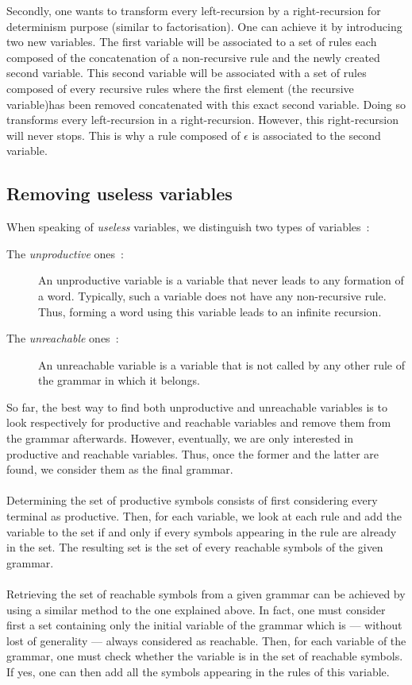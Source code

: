 \documentclass[a4paper,11pt]{article}
\begin{document}
    Secondly, one wants to transform every left-recursion by a right-recursion for determinism purpose (similar to factorisation). One can achieve it by introducing two new variables. The first variable will be associated to a set of rules each composed of the concatenation of a non-recursive rule and the newly created second variable. This second variable will be associated with a set of rules composed of every recursive rules where the first element (the recursive variable)has been removed concatenated with this exact second variable. Doing so transforms every left-recursion in a right-recursion. However, this right-recursion will never stops. This is why a rule composed of $\epsilon$ is associated to the second variable.

  \subsection{Removing useless variables}
    \label{sec:useless}
    When speaking of \textit{useless} variables, we distinguish two types of variables~:
    \begin{description}
      \item[The \textit{unproductive} ones~:]
  An unproductive variable is a variable that never leads to any formation of a word. Typically, such a variable does not have any non-recursive rule. Thus, forming a word using this variable leads to an infinite recursion.
      \item[The \textit{unreachable} ones~:]
  An unreachable variable is a variable that is not called by any other rule of the grammar in which it belongs.
    \end{description}
    So far, the best way to find both unproductive and unreachable variables is to look respectively for productive and reachable variables and remove them from the grammar afterwards. However, eventually, we are only interested in productive and reachable variables. Thus, once the former and the latter are found, we consider them as the final grammar.\\\\
    Determining the set of productive symbols consists of first considering every terminal as productive. Then, for each variable, we look at each rule and add the variable to the set if and only if every symbols appearing in the rule are already in the set. The resulting set is the set of every reachable symbols of the given grammar.\\\\
    Retrieving the set of reachable symbols from a given grammar can be achieved by using a similar method to the one explained above. In fact, one must consider first a set containing only the initial variable of the grammar which is --- without lost of generality --- always considered as reachable. Then, for each variable of the grammar, one must check whether the variable is in the set of reachable symbols. If yes, one can then add all the symbols appearing in the rules of this variable.
    
\end{document}
